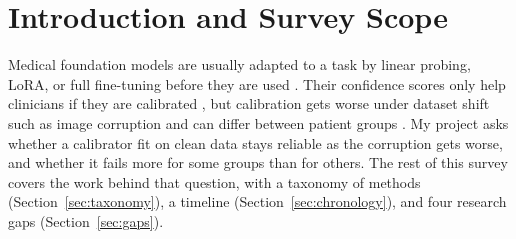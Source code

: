 \documentclass[sigconf,nonacm]{acmart}
\begin{document}


\maketitle

\section{Introduction and Survey Scope}

Medical foundation models are usually adapted to a task by linear probing, LoRA, or full fine-tuning before they are used \cite{hu2022lora,kumar2022finetuning,jin2024fairmedfm}. Their confidence scores only help clinicians if they are calibrated \cite{guo2017calibration}, but calibration gets worse under dataset shift such as image corruption \cite{ovadia2019trust} and can differ between patient groups \cite{riccilara2023calibration,dominique2025calibration}. My project asks whether a calibrator fit on clean data stays reliable as the corruption gets worse, and whether it fails more for some groups than for others. The rest of this survey covers the work behind that question, with a taxonomy of methods (Section~\ref{sec:taxonomy}), a timeline (Section~\ref{sec:chronology}), and four research gaps (Section~\ref{sec:gaps}).
\end{document}
